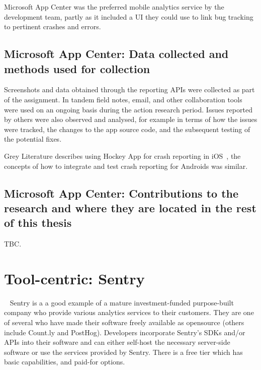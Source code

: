 Microsoft App Center was the preferred mobile analytics service by the development team, partly as it included a UI they could use to link bug tracking to pertinent crashes and errors.

\subsection{Microsoft App Center: Data collected and methods used for collection}
Screenshots and data obtained through the reporting APIs were collected as part of the assignment. In tandem field notes, email, and other collaboration tools were used on an ongoing basis during the action research period. Issues reported by others were also observed and analysed, for example in terms of how the issues were tracked, the changes to the app source code, and the subsequent testing of the potential fixes.

Grey Literature describes using Hockey App for crash reporting in iOS~, the concepts of how to integrate and test crash reporting for Androids was similar.

\subsection{Microsoft App Center: Contributions to the research and where they are located in the rest of this thesis}
TBC.


\clearpage


\section{Tool-centric: Sentry}~\label{case-study-overview-sentry}
Sentry is a a good example of a mature investment-funded purpose-built company who provide various analytics services to their customers. They are one of several who have made their software freely available as opensource (others include Count.ly and PostHog). Developers incorporate Sentry's SDKs and/or APIs into their software and can either self-host the necessary server-side software or use the services provided by Sentry. There is a free tier which has basic capabilities, and paid-for options.

